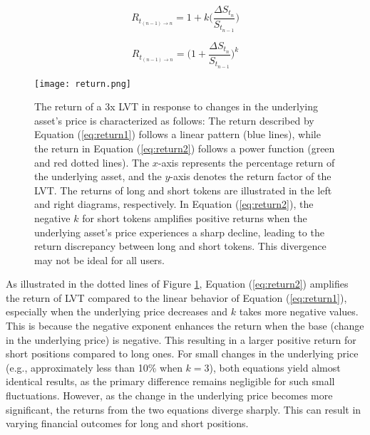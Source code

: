 \noindent
\begin{minipage}{0.5\linewidth}
	\begin{equation}
		R_{t_{(n-1)\to n}}=1+k\Big(\frac{\Delta S_{t_{n}}}{S_{t_{n-1}}}\Big) \label{eq:return1}
	\end{equation}
\end{minipage}
\begin{minipage}{0.5\linewidth}
	\begin{equation}
		R_{t_{(n-1)\to n}}=\Big(1+\frac{\Delta S_{t_{n}}}{S_{t_{n-1}}}\Big)^k \label{eq:return2}
	\end{equation}
\end{minipage}

\begin{figure}[t]
	\texttt{[image: return.png]}
	\caption{The return of a 3x LVT in response to changes in the underlying asset's price is characterized as follows: The return described by Equation (\ref{eq:return1}) follows a linear pattern (blue lines), while the return in Equation (\ref{eq:return2}) follows a power function (green and red dotted lines). The \(x\)-axis represents the percentage return of the underlying asset, and the \(y\)-axis denotes the return factor of the LVT. The returns of long and short tokens are illustrated in the left and right diagrams, respectively. In Equation (\ref{eq:return2}), the negative \(k\) for short tokens amplifies positive returns when the underlying asset's price experiences a sharp decline, leading to the return discrepancy between long and short tokens. This divergence may not be ideal for all users.}
	\label{fig:return}
\end{figure}

As illustrated in the dotted lines of Figure \ref{fig:return}, Equation (\ref{eq:return2}) amplifies the return of LVT compared to the linear behavior of Equation (\ref{eq:return1}), especially when the underlying price decreases and \(k\) takes more negative values. This is because the negative exponent enhances the return when the base (\ie change in the underlying price) is negative. This resulting in a larger positive return for short positions compared to long ones. For small changes in the underlying price (e.g., approximately less than 10\% when \(k = 3\)), both equations yield almost identical results, as the primary difference remains negligible for such small fluctuations. However, as the change in the underlying price becomes more significant, the returns from the two equations diverge sharply. This can result in varying financial outcomes for long and short positions.

